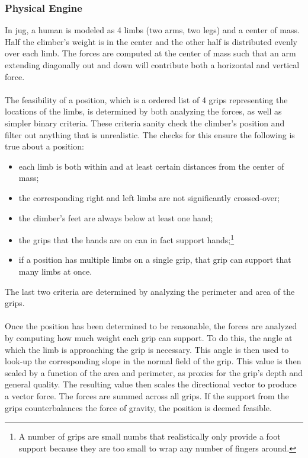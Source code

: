 \documentclass[pdftex,12pt]{article}
\theoremstyle{definition}
\theoremstyle{remark}
\begin{document}
\subsubsection*{Physical Engine}
In jug, a human is modeled as 4 limbs (two arms, two legs) and a center of mass. Half the climber's weight is in the center and the other half is distributed evenly over each limb. The forces are computed at the center of mass such that an arm extending diagonally out and down will contribute both a horizontal and vertical force.\\ \\
The feasibility of a position, which is a ordered list of 4 grips representing the locations of the limbs, is determined by both analyzing the forces, as well as simpler binary criteria. These criteria sanity check the climber's position and filter out anything that is unrealistic. The checks for this ensure the following is true about a position:
\begin{itemize}
\setlength{\itemsep}{0pt}
\setlength{\parskip}{0pt}
 \item each limb is both within and at least certain distances from the center of mass;
 \item the corresponding right and left limbs are not significantly crossed-over;
 \item the climber's feet are always below at least one hand;
 \item the grips that the hands are on can in fact support hands;\footnote{A number of grips are small numbs that realistically only provide a foot support because they are too small to wrap any number of fingers around.}
 \item if a position has multiple limbs on a single grip, that grip can support that many limbs at once.
\end{itemize}
The last two criteria are determined by analyzing the perimeter and area of the grips.\\ \\
Once the position has been determined to be reasonable, the forces are analyzed by computing how much weight each grip can support. To do this, the angle at which the limb is approaching the grip is necessary. This angle is then used to look-up the corresponding slope in the normal field of the grip. This value is then scaled by a function of the area and perimeter, as proxies for the grip's depth and general quality. The resulting value then scales the directional vector to produce a vector force. The forces are summed across all grips. If the support from the grips counterbalances the force of gravity, the position is deemed feasible.
\end{document}

